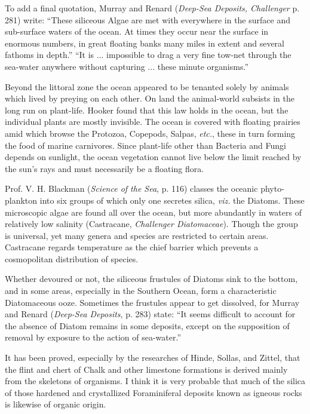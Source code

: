 \documentclass[a4paper, 12pt, oneside]{article}
\begin{document}
To add a final quotation, Murray and Renard (\emph{Deep-Sea Deposits, Challenger} p. 281) write: ``These siliceous Algae are met with everywhere in the surface and sub-surface waters of the ocean. At times they occur near the surface in enormous numbers, in great floating banks many miles in extent and several fathoms in depth.'' ``It is ... impossible to drag a very fine tow-net through the sea-water anywhere without capturing ... these minute organisms.'' 

Beyond the littoral zone the ocean appeared to be tenanted solely by animals which lived by preying on each other. On land the animal-world subsists in the long run on plant-life. Hooker found that this law holds in the ocean, but the individual plants are mostly invisible. The ocean is covered with floating prairies amid which browse the Protozoa, Copepods, Salpas, \emph{etc.}, these in turn forming the food of marine carnivores. Since plant-life other than Bacteria and Fungi depends on sunlight, the ocean vegetation cannot live below the limit reached by the sun's rays and must necessarily be a floating flora. 

Prof. V. H. Blackman (\emph{Science of the Sea}, p. 116) classes the oceanic phyto-plankton into six groups of which only one secretes silica, \emph{viz.} the Diatoms. These microscopic algae are found all over the ocean, but more abundantly in waters of relatively low salinity (Castracane, \emph{Challenger Diatomaceae}). Though the group is universal, yet many genera and species are restricted to certain areas. Castracane regards temperature as the chief barrier which prevents a cosmopolitan distribution of species.

Whether devoured or not, the siliceous frustules of Diatoms sink to the bottom, and in some areas, especially in the Southern Ocean, form a characteristic Diatomaceous ooze. Sometimes the frustules appear to get dissolved, for Murray and Renard (\emph{Deep-Sea Deposits}, p. 283) state: ``It seems difficult to account for the absence of Diatom remains in some deposits, except on the supposition of removal by exposure to the action of sea-water.''

It has been proved, especially by the researches of Hinde, Sollas, and Zittel, that the flint and chert of Chalk and other limestone formations is derived mainly from the skeletons of organisms. I think it is very probable that much of the silica of those hardened and crystallized Foraminiferal deposits known as igneous rocks is likewise of organic origin.
\end{document}
